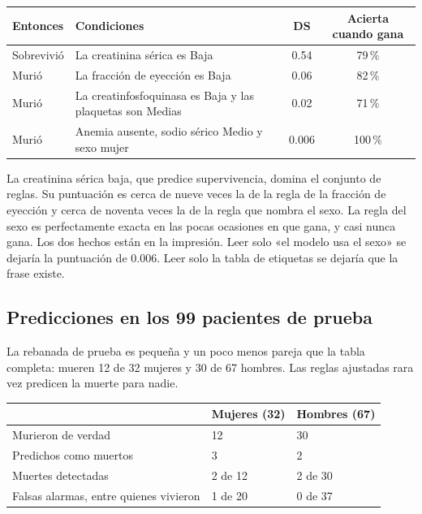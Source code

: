 \documentclass[11pt]{article}
\newcommand{\pct}[1]{\mbox{#1\,\%}}
\begin{document}
\begin{table}[H]
\centering
\small
\begin{tabularx}{\textwidth}{@{}l Y c c@{}}
\toprule
Entonces & Condiciones & DS & Acierta cuando gana \\
\midrule
{}
Sobrevivió & La creatinina sérica es Baja & 0.54 & \pct{79} \\
Murió & La fracción de eyección es Baja & 0.06 & \pct{82} \\
Murió & La creatinfosfoquinasa es Baja y las plaquetas son Medias & 0.02 & \pct{71} \\
Murió & Anemia ausente, sodio sérico Medio y sexo mujer & 0.006 & \pct{100} \\
\bottomrule
\end{tabularx}
\end{table}

La creatinina sérica baja, que predice supervivencia, domina el conjunto de reglas. Su puntuación es cerca de nueve veces la de la regla de la fracción de eyección y cerca de noventa veces la de la regla que nombra el sexo. La regla del sexo es perfectamente exacta en las pocas ocasiones en que gana, y casi nunca gana. Los dos hechos están en la impresión. Leer solo «el modelo usa el sexo» se dejaría la puntuación de 0.006. Leer solo la tabla de etiquetas se dejaría que la frase existe.

\subsection{Predicciones en los 99 pacientes de prueba}

La rebanada de prueba es pequeña y un poco menos pareja que la tabla completa: mueren 12 de 32 mujeres y 30 de 67 hombres. Las reglas ajustadas rara vez predicen la muerte para nadie.

\begin{table}[H]
\centering
\small
\begin{tabularx}{\textwidth}{@{}l Y Y@{}}
\toprule
 & Mujeres (32) & Hombres (67) \\
\midrule
Murieron de verdad & 12 & 30 \\
Predichos como muertos & 3 & 2 \\
Muertes detectadas & 2 de 12 & 2 de 30 \\
Falsas alarmas, entre quienes vivieron & 1 de 20 & 0 de 37 \\
\bottomrule
\end{tabularx}
\end{table}
\end{document}
